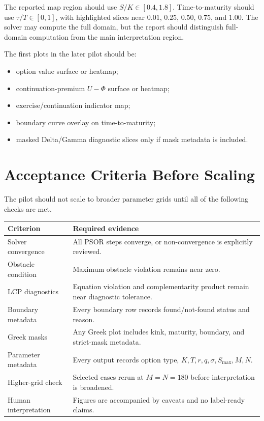 \documentclass[11pt,a4paper]{article}
\begin{document}
The reported map region should use \(S/K \in [0.4,1.8]\). Time-to-maturity should use
\(\tau/T \in [0,1]\), with highlighted slices near \(0.01\), \(0.25\), \(0.50\), \(0.75\), and
\(1.00\). The solver may compute the full domain, but the report should distinguish full-domain
computation from the main interpretation region.

The first plots in the later pilot should be:
\begin{itemize}
  \item option value surface or heatmap;
  \item continuation-premium \(U-\Phi\) surface or heatmap;
  \item exercise/continuation indicator map;
  \item boundary curve overlay on time-to-maturity;
  \item masked Delta/Gamma diagnostic slices only if mask metadata is included.
\end{itemize}

\section{Acceptance Criteria Before Scaling}

The pilot should not scale to broader parameter grids until all of the following checks are met.

\begin{longtable}{L{0.34\textwidth} L{0.48\textwidth}}
\toprule
Criterion & Required evidence \\
\midrule
\endhead
Solver convergence & All PSOR steps converge, or non-convergence is explicitly reviewed. \\
Obstacle condition & Maximum obstacle violation remains near zero. \\
LCP diagnostics & Equation violation and complementarity product remain near diagnostic tolerance. \\
Boundary metadata & Every boundary row records found/not-found status and reason. \\
Greek masks & Any Greek plot includes kink, maturity, boundary, and strict-mask metadata. \\
Parameter metadata & Every output records option type, \(K,T,r,q,\sigma,S_{\max},M,N\). \\
Higher-grid check & Selected cases rerun at \(M=N=180\) before interpretation is broadened. \\
Human interpretation & Figures are accompanied by caveats and no label-ready claims. \\
\bottomrule
\end{longtable}
\end{document}
